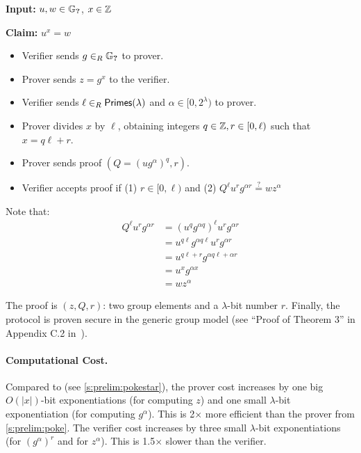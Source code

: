 \label{s:prelim:poke2}
\noindent \textbf{Input:} $u,w\in \mathbb{G}_{\textbf{?}}$, $x\in \mathbb{Z}$

\noindent \textbf{Claim:} $u^x = w$
\begin{itemize}
\item Verifier sends $g\in_R \mathbb{G}_{\textbf{?}}$ to prover.
\item Prover sends $z = g^x$ to the verifier.
\item Verifier sends $\ell \in_R \mathsf{Primes}(\lambda) $ and $\alpha \in [0, 2^\lambda)$ to prover.
\item Prover divides $x$ by $\ell$, obtaining integers $q\in \mathbb{Z},r\in [0,\ell)$ such that $x = q\ell + r$.
\item Prover sends proof $(Q=(ug^{\alpha})^q, r)$.
\item Verifier accepts proof if (1) $r \in [0, \ell)$ and (2) $Q^\ell u^{r} g^{\alpha r} \stackrel{?}{=} w z^{\alpha}$
\end{itemize}

Note that:
\begin{align*}
Q^\ell u^r g^{\alpha r} 
 &= (u^qg^{\alpha q})^\ell u^r g^{\alpha r}\\
 &= u^{q\ell} g^{\alpha q\ell} u^r g^{\alpha r}\\
 &= u^{q\ell+r} g^{\alpha q\ell + \alpha r}\\
 &= u^{x} g^{\alpha x}\\
 &= w z^\alpha
\end{align*}

The proof is $(z, Q, r)$: two group elements and a $\lambda$-bit number $r$.
Finally, the \poketwo protocol is proven secure in the generic group model (see ``Proof of Theorem 3'' in Appendix C.2 in~\cite{BBF18}).

\paragraph{Computational Cost.}
Compared to \pokestar (see \cref{s:prelim:pokestar}), the prover cost increases by one big $O(|x|)$-bit exponentiations (for computing $z$) and one small $\lambda$-bit exponentiation (for computing $g^\alpha$).
This is 2$\times$ more efficient than the \poke prover from \cref{s:prelim:poke}.
The verifier cost increases by three small $\lambda$-bit exponentiations (for $(g^\alpha)^r$ and for $z^\alpha$).
This is 1.5$\times$ slower than the \poke verifier.